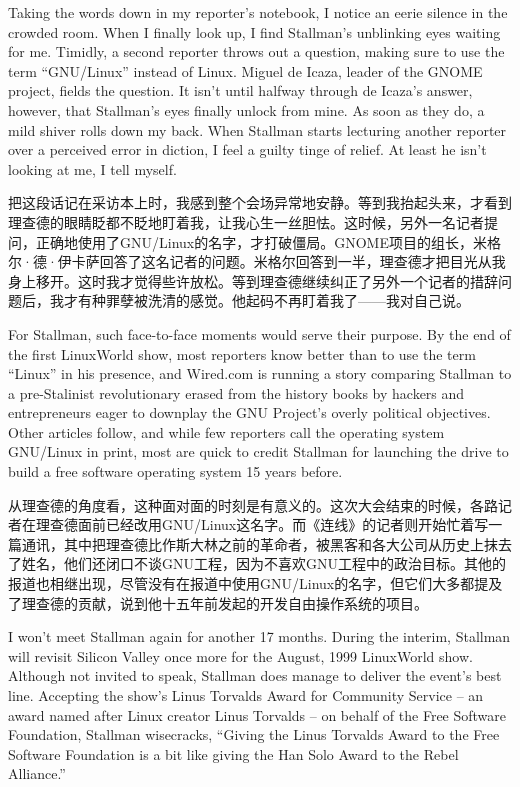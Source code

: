 \ifdefined\eng
Taking the words down in my reporter's notebook, I notice an eerie silence in the crowded room. When I finally look up, I find Stallman's unblinking eyes waiting for me. Timidly, a second reporter throws out a question, making sure to use the term ``GNU/Linux'' instead of Linux. Miguel de Icaza, leader of the GNOME project, fields the question. It isn't until halfway through de Icaza's answer, however, that Stallman's eyes finally unlock from mine. As soon as they do, a mild shiver rolls down my back. When Stallman starts lecturing another reporter over a perceived error in diction, I feel a guilty tinge of relief. At least he isn't looking at me, I tell myself.
\fi

\ifdefined\chs
把这段话记在采访本上时，我感到整个会场异常地安静。等到我抬起头来，才看到理查德的眼睛眨都不眨地盯着我，让我心生一丝胆怯。这时候，另外一名记者提问，正确地使用了GNU/Linux的名字，才打破僵局。GNOME项目的组长，米格尔·德·伊卡萨回答了这名记者的问题。米格尔回答到一半，理查德才把目光从我身上移开。这时我才觉得些许放松。等到理查德继续纠正了另外一个记者的措辞问题后，我才有种罪孽被洗清的感觉。他起码不再盯着我了——我对自己说。
\fi

\ifdefined\eng
For Stallman, such face-to-face moments would serve their purpose. By the end of the first LinuxWorld show, most reporters know better than to use the term ``Linux'' in his presence, and Wired.com is running a story comparing Stallman to a pre-Stalinist revolutionary erased from the history books by hackers and entrepreneurs eager to downplay the GNU Project's overly political objectives. Other articles follow, and while few reporters call the operating system GNU/Linux in print, most are quick to credit Stallman for launching the drive to build a free software operating system 15 years before.
\fi

\ifdefined\chs
从理查德的角度看，这种面对面的时刻是有意义的。这次大会结束的时候，各路记者在理查德面前已经改用GNU/Linux这名字。而《连线》的记者则开始忙着写一篇通讯，其中把理查德比作斯大林之前的革命者，被黑客和各大公司从历史上抹去了姓名，他们还闭口不谈GNU工程，因为不喜欢GNU工程中的政治目标。其他的报道也相继出现，尽管没有在报道中使用GNU/Linux的名字，但它们大多都提及了理查德的贡献，说到他十五年前发起的开发自由操作系统的项目。
\fi

\ifdefined\eng
I won't meet Stallman again for another 17 months. During the interim, Stallman will revisit Silicon Valley once more for the August, 1999 LinuxWorld show. Although not invited to speak, Stallman does manage to deliver the event's best line. Accepting the show's Linus Torvalds Award for Community Service -- an award named after Linux creator Linus Torvalds -- on behalf of the Free Software Foundation, Stallman wisecracks, ``Giving the Linus Torvalds Award to the Free Software Foundation is a bit like giving the Han Solo Award to the Rebel Alliance.''
\fi

